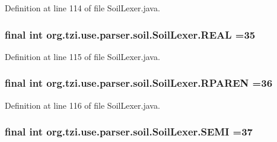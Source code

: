 Definition at line 114 of file Soil\-Lexer.\-java.

\hypertarget{classorg_1_1tzi_1_1use_1_1parser_1_1soil_1_1_soil_lexer_afccc0874e991e9f226507232a1577100}{
\subsubsection[{R\-E\-A\-L}]{\setlength{\rightskip}{0pt plus 5cm}final int org.\-tzi.\-use.\-parser.\-soil.\-Soil\-Lexer.\-R\-E\-A\-L =35\hspace{0.3cm}{\ttfamily [static]}}}\label{classorg_1_1tzi_1_1use_1_1parser_1_1soil_1_1_soil_lexer_afccc0874e991e9f226507232a1577100}


Definition at line 115 of file Soil\-Lexer.\-java.

\hypertarget{classorg_1_1tzi_1_1use_1_1parser_1_1soil_1_1_soil_lexer_a0789364a25aa234d52077edaf6c884c8}{
\subsubsection[{R\-P\-A\-R\-E\-N}]{\setlength{\rightskip}{0pt plus 5cm}final int org.\-tzi.\-use.\-parser.\-soil.\-Soil\-Lexer.\-R\-P\-A\-R\-E\-N =36\hspace{0.3cm}{\ttfamily [static]}}}\label{classorg_1_1tzi_1_1use_1_1parser_1_1soil_1_1_soil_lexer_a0789364a25aa234d52077edaf6c884c8}


Definition at line 116 of file Soil\-Lexer.\-java.

\hypertarget{classorg_1_1tzi_1_1use_1_1parser_1_1soil_1_1_soil_lexer_a8d9772c53fb99cdeb21b0ead62b9c125}{
\subsubsection[{S\-E\-M\-I}]{\setlength{\rightskip}{0pt plus 5cm}final int org.\-tzi.\-use.\-parser.\-soil.\-Soil\-Lexer.\-S\-E\-M\-I =37\hspace{0.3cm}{\ttfamily [static]}}}\label{classorg_1_1tzi_1_1use_1_1parser_1_1soil_1_1_soil_lexer_a8d9772c53fb99cdeb21b0ead62b9c125}


